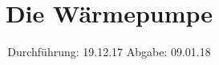 

\subject{V206}
\title{Die Wärmepumpe}
\date{%
  Durchführung: 19.12.17
  \hspace{3em}
  Abgabe: 09.01.18
}



\maketitle
\thispagestyle{empty}
\tableofcontents
\newpage






\printbibliography{}


